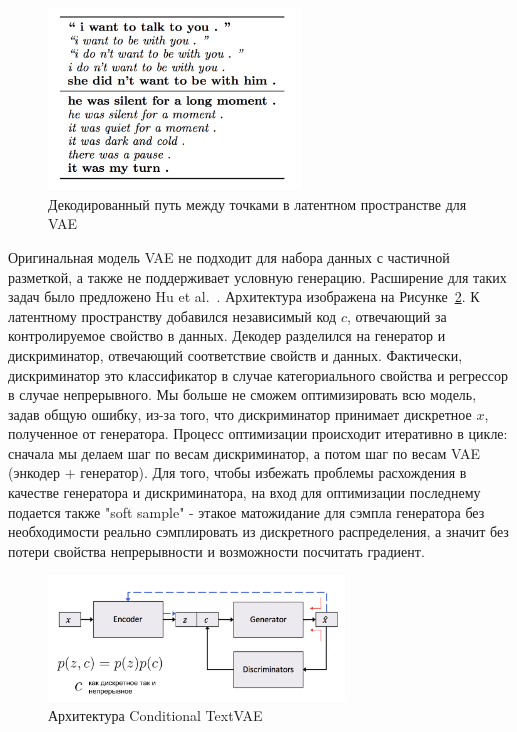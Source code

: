 \documentclass{spbau-diploma}
\begin{document}
\begin{figure}[h]
\centering
\includegraphics[width=0.6\textwidth]{images/vae_path.png}
\caption{Декодированный путь между точками в латентном пространстве для VAE}
\label{vae_path}
\end{figure}

Оригинальная модель VAE не подходит для набора данных с частичной разметкой, а 
также не поддерживает условную генерацию. Расширение для таких задач было 
предложено Hu et al.~\cite{text_cvae}. Архитектура изображена на 
Рисунке~\ref{cvae}. К латентному пространству добавился независимый код $c$,
отвечающий за контролируемое свойство в данных. Декодер разделился на генератор 
и дискриминатор, отвечающий соответствие свойств и данных. Фактически, 
дискриминатор это классификатор в случае категориального свойства и регрессор в
случае непрерывного. Мы больше не сможем оптимизировать всю модель, задав общую
ошибку, из-за того, что дискриминатор принимает дискретное $x$, полученное от
генератора. Процесс оптимизации происходит итеративно в цикле: сначала мы 
делаем шаг по весам дискриминатор, а потом шаг по весам VAE (энкодер + 
генератор). Для того, чтобы избежать проблемы расхождения в качестве генератора
и дискриминатора, на вход для оптимизации последнему подается также 
"soft sample" - этакое матожидание для сэмпла генератора без необходимости
реально сэмплировать из дискретного распределения, а значит без потери свойства
непрерывности и возможности посчитать градиент.

\begin{figure}[h]
\centering
\includegraphics[width=0.7\textwidth]{images/cvae.png}
\caption{Архитектура Conditional TextVAE}
\label{cvae}
\end{figure}
\end{document}
